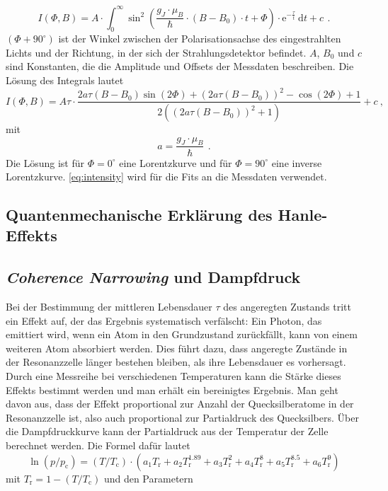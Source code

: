 \begin{equation}
\label{}
I(\Phi,B) = A \cdot \int_0^{\infty} \sin^2 \left( \frac{g_J \cdot \mu_B}{\hbar} \cdot (B-B_0) \cdot t + \Phi \right) \cdot
\text{e}^{-\frac{\tau}{t}} \ \text{d}t + c \, \ .
\end{equation}
$(\Phi + 90^{\circ})$ ist der Winkel zwischen der Polarisationsachse des eingestrahlten Lichts und der Richtung,
in der sich der Strahlungsdetektor befindet.
$A$, $B_0$ und $c$ sind Konstanten, die die Amplitude und Offsets der Messdaten beschreiben.
Die Lösung des Integrals lautet
\begin{equation}
\label{eq:intensity}
I(\Phi,B) = A \tau \cdot \frac{2 a \tau  (B-B_0) \sin (2 \Phi )+(2 a \tau  (B-B_0))^2-\cos (2 \Phi )+1}
{2 \left((2 a \tau  (B-B_0))^2+1\right)}+c \ ,
\end{equation}
mit
\begin{equation}
\label{}
a=\frac{g_J \cdot \mu_B}{\hbar} \, \ .
\end{equation}
Die Lösung ist für $\Phi=0^{\circ}$ eine Lorentzkurve und für $\Phi=90^{\circ}$ eine inverse Lorentzkurve.
\autoref{eq:intensity} wird für die Fits an die Messdaten verwendet.

\subsection{Quantenmechanische Erklärung des Hanle-Effekts}

\subsection{\emph{Coherence Narrowing} und Dampfdruck}

Bei der Bestimmung der mittleren Lebensdauer $\tau$ des angeregten Zustands tritt ein Effekt auf,
der das Ergebnis systematisch verfälscht:
Ein Photon, das emittiert wird, wenn ein Atom in den Grundzustand zurückfällt,
kann von einem weiteren Atom absorbiert werden.
Dies führt dazu, dass angeregte Zustände in der Resonanzzelle länger bestehen bleiben,
als ihre Lebensdauer es vorhersagt.
Durch eine Messreihe bei verschiedenen Temperaturen kann die Stärke dieses Effekts bestimmt werden und
man erhält ein bereinigtes Ergebnis.
Man geht davon aus, dass der Effekt proportional zur Anzahl der Quecksilberatome in der Resonanzzelle ist,
also auch proportional zur Partialdruck des Quecksilbers.
Über die Dampfdruckkurve kann der Partialdruck aus der Temperatur der Zelle berechnet werden.
Die Formel dafür lautet
\begin{equation}
\label{eq:vaporpress}
\ln(p/p_{\text{c}})= (T/T_{\text{c}}) \cdot (a_1T_{\text{r}}^{}+a_2T_{\text{r}}^{1.89}+a_3T_{\text{r}}^{2}
+a_4T_{\text{r}}^{8}+a_5T_{\text{r}}^{8.5}+a_6T_{\text{r}}^{9})
\end{equation}
mit $T_{\text{r}}=1-(T/T_{\text{c}})$ und den Parametern



